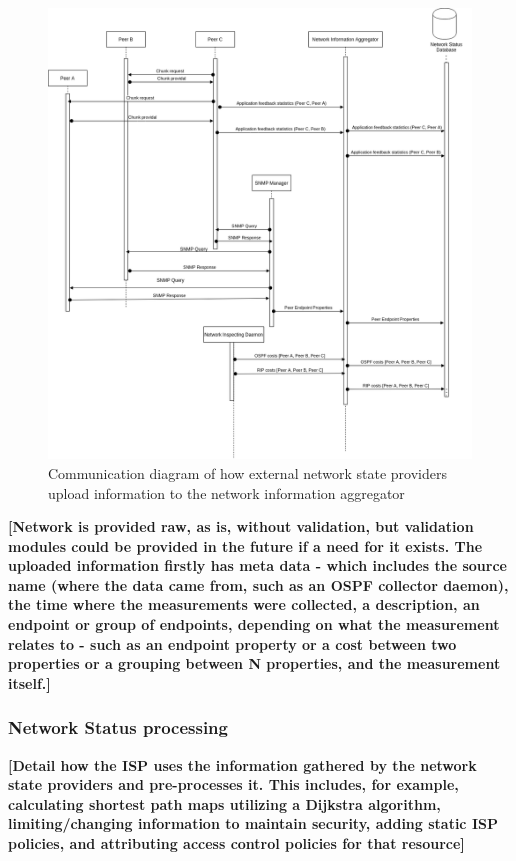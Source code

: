 \begin{figure}[!h]
        \centering
        \includegraphics[scale=0.3]{img/info-provisioning-providers.png}
        \caption{Communication diagram of how external network state providers upload information to the network information aggregator}
        \label{fig:provisioning-providers}
\end{figure}


    \textbf{[Network is provided raw, as is, without validation, but validation modules could be provided in the future if a need for it exists. The uploaded information firstly has meta data - which includes the source name (where the data came from, such as an OSPF collector daemon), the time where the measurements were collected, a description, an endpoint or group of endpoints, depending on what the measurement relates to - such as an endpoint property or a cost between two properties or a grouping between N properties, and the measurement itself.]}


\subsubsection{Network Status processing}

    \textbf{[Detail how the ISP uses the information gathered by the network state providers and pre-processes it. This includes, for example, calculating shortest path maps utilizing a Dijkstra algorithm, limiting/changing information to maintain security, adding static ISP policies, and attributing access control policies for that resource]}

